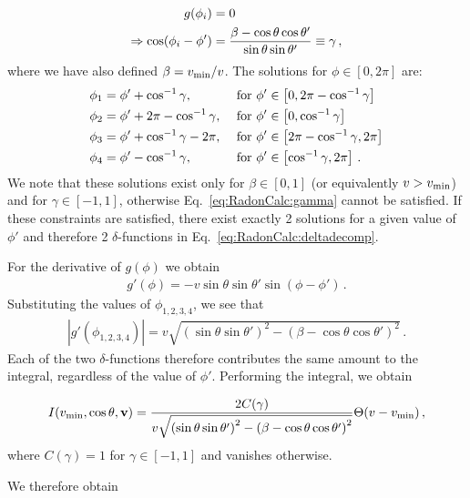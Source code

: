 \begin{align}
\label{eq:RadonCalc:gamma}
g(\phi_i) &= 0 \notag\\
\Rightarrow \cos(\phi_i - \phi') &= \frac{\beta - \cos\theta\cos\theta'}{\sin\theta \sin\theta'} \equiv \gamma\,,
\end{align}
where we have also defined $\beta = \vmin/v$. The solutions for $\phi \in [0,2\pi]$ are:
\begin{align}
\phi_1 &= \phi' + \cos^{-1}\gamma, & \textrm{ for } &  \phi' \in \left[0, 2\pi - \cos^{-1}\gamma\right] \notag\\
\phi_2 &= \phi' + 2\pi - \cos^{-1}\gamma, & \textrm{ for } & \phi' \in \left[0, \cos^{-1}\gamma\right] \notag\\
\phi_3 &= \phi' + \cos^{-1}\gamma -2\pi, & \textrm{ for } & \phi' \in \left[2\pi - \cos^{-1}\gamma, 2\pi\right] \notag\\
\phi_4 &= \phi' -\cos^{-1}\gamma, & \textrm{ for } & \phi' \in \left[\cos^{-1}\gamma, 2\pi\right] \,.
\end{align}
We note that these solutions exist only for $\beta \in \left[0,1\right]$ (or equivalently $v > \vmin$) and for $\gamma \in [-1,1]$, otherwise Eq.~\ref{eq:RadonCalc:gamma} cannot be satisfied. If these constraints are satisfied, there exist exactly 2 solutions for a given value of $\phi'$ and therefore 2 $\delta$-functions in Eq.~\ref{eq:RadonCalc:deltadecomp}.

For the derivative of $g(\phi)$ we obtain
\begin{align}
g'(\phi) = -v\sin\theta\sin\theta'\sin(\phi-\phi')\,.
\end{align}
Substituting the values of $\phi_{1,2,3,4}$, we see that
\begin{align}
|g'(\phi_{1,2,3,4})| = v\sqrt{\left(\sin\theta\sin\theta'\right)^2 - \left(\beta - \cos\theta\cos\theta'\right)^2}\,.
\end{align}
Each of the two $\delta$-functions therefore contributes the same amount to the integral, regardless of the value of $\phi'$. Performing the integral, we obtain

\begin{equation}
I(\vmin, \cos\theta, \mathbf{v}) = \frac{2 C(\gamma)}{v\sqrt{\left(\sin\theta\sin\theta'\right)^2 - \left(\beta - \cos\theta\cos\theta'\right)^2}}\Theta(v - \vmin)\,,
\end{equation}
where $C(\gamma) = 1$ for $\gamma \in [-1,1]$ and vanishes otherwise.

We therefore obtain

